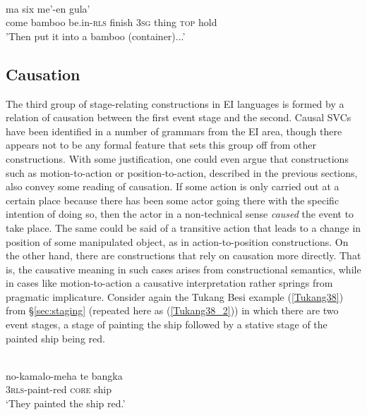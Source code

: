 \ea \label{Teiwa_xy}
\\
\gll ma six me'-en gula' \\
come bamboo be.in-\textsc{rls} finish 3\textsc{sg} thing \textsc{top} hold \\
\glft 'Then put it into a bamboo (container)...'\\ 
\z

\subsection{Causation} \label{sec:causation}

The third group of stage-relating constructions in EI languages is formed by a relation of causation between the first event stage and the second. Causal SVCs have been identified in a number of grammars from the EI area, though there appears not to be any formal feature that sets this group off from other constructions. With some justification, one could even argue that constructions such as motion-to-action or position-to-action, described in the previous sections, also convey some reading of causation. If some action is only carried out at a certain place because there has been some actor going there with the specific intention of doing so, then the actor in a non-technical sense \textit{caused} the event to take place. The same could be said of a transitive action that leads to a change in position of some manipulated object, as in action-to-position constructions. On the other hand, there are constructions that rely on causation more directly. That is, the causative  meaning in such cases arises from constructional semantics, while in cases like motion-to-action a causative interpretation rather springs from pragmatic implicature. Consider again the Tukang Besi example (\ref{Tukang38}) from §\ref{sec:staging} (repeated here as (\ref{Tukang38_2})) in which there are two event stages, a stage of painting the ship followed by a stative stage of the painted ship being red.

\ea \label{Tukang38_2}
\\
\gll no-kamalo-meha te bangka \\
3\textsc{rls}-paint-red \textsc{core} ship \\
\glft `They painted the ship red.'\\ 
\z


